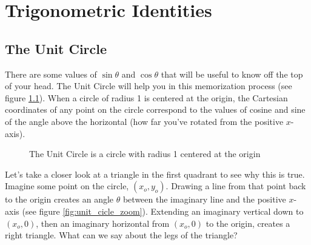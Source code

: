 \chapter{Trigonometric Identities}

\section{The Unit Circle}
There are some values of $\sin{\theta}$ and $\cos{\theta}$ that will be 
useful to know off the top of your head. The Unit Circle will help you in this 
memorization process (see figure \ref{fig:unit_cicle_blank}). When a circle of 
radius 1 is centered at the origin, the Cartesian coordinates of any point on 
the circle correspond to the values of cosine and sine of the angle above 
the horizontal (how far you've rotated from the positive $x$-axis). 

\begin{figure}[htbp]
    \centering
    \caption{The Unit Circle is a circle with radius 1 centered at the origin}
    \label{fig:unit_cicle_blank}
\end{figure}

Let's take a closer look at a triangle in the first quadrant to see why this 
is true. Imagine some point on the circle, $(x_o, y_o)$. Drawing a line from 
that point back to the origin creates an angle $\theta$ between the imaginary 
line and the positive $x$-axis (see figure \ref{fig:unit_cicle_zoom}). 
Extending an imaginary vertical down to $(x_o, 0)$, then an imaginary 
horizontal from $(x_o, 0)$ to the origin, creates a right triangle. What can we 
say about the legs of the triangle?

